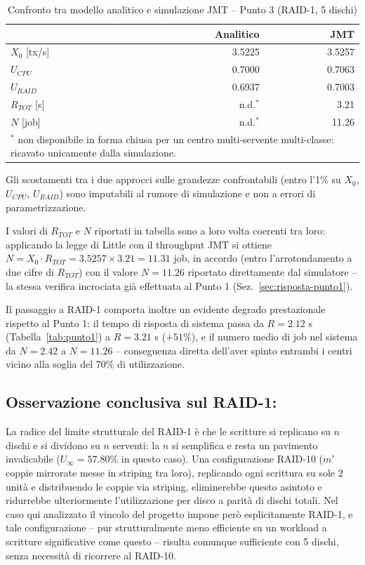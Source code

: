 \documentclass[11pt,a4paper]{article}
\begin{document}
\begin{table}[h]
\centering
\caption{Confronto tra modello analitico e simulazione JMT -- Punto 3 (RAID-1, 5 dischi)}
\label{tab:punto3}
\begin{tabular}{lrr}
\toprule
 & Analitico & JMT \\
\midrule
$X_0$ [tx/s] & 3.5225 & 3.5257 \\
$U_{CPU}$ & 0.7000 & 0.7063 \\
$U_{RAID}$ & 0.6937 & 0.7003 \\
$R_{TOT}$ [s] & n.d.$^\ast$ & 3.21 \\
$N$ [job] & n.d.$^\ast$ & 11.26 \\
\midrule
\multicolumn{3}{p{0.85\textwidth}}{\footnotesize $^\ast$ non disponibile in forma chiusa per un
centro multi-servente multi-classe: ricavato unicamente dalla simulazione.}\\
\bottomrule
\end{tabular}
\end{table}

Gli scostamenti tra i due approcci sulle grandezze confrontabili (entro l'1\% su $X_0$, $U_{CPU}$,
$U_{RAID}$) sono imputabili al rumore di simulazione e non a errori di parametrizzazione.

I valori di $R_{TOT}$ e $N$ riportati in tabella sono a loro volta coerenti tra loro: applicando la
legge di Little con il throughput JMT si ottiene $N = X_0\cdot R_{TOT} = 3.5257\times 3.21 = 11.31$
job, in accordo (entro l'arrotondamento a due cifre di $R_{TOT}$) con il valore $N=11.26$ riportato
direttamente dal simulatore -- la stessa verifica incrociata già effettuata al Punto 1
(Sez.~\ref{sec:risposta-punto1}).

Il passaggio a RAID-1 comporta inoltre un evidente degrado prestazionale rispetto al Punto 1: il
tempo di risposta di sistema passa da $R=2.12$ s (Tabella~\ref{tab:punto1}) a $R=3.21$ s
($+51\%$), e il numero medio di job nel sistema da $N=2.42$ a $N=11.26$ -- conseguenza diretta
dell'aver spinto entrambi i centri
vicino alla soglia del 70\% di utilizzazione.

\subsection{Osservazione conclusiva sul RAID-1:}

La radice del limite strutturale del RAID-1 è che le scritture si replicano su $n$ dischi e si
dividono su $n$ serventi: la $n$ si semplifica e resta un pavimento invalicabile
($U_\infty=57.80\%$ in questo caso). Una configurazione RAID-10 ($m'$ coppie mirrorate messe in
striping tra loro), replicando ogni scrittura su sole 2 unità e distribuendo le coppie via striping,
eliminerebbe questo asintoto e ridurrebbe ulteriormente l'utilizzazione per disco a parità di
dischi totali. Nel caso qui analizzato il vincolo del progetto impone però esplicitamente RAID-1,
e tale configurazione -- pur strutturalmente meno efficiente su un workload a scritture
significative come questo -- risulta comunque sufficiente con 5 dischi, senza necessità di ricorrere
al RAID-10.
\end{document}
